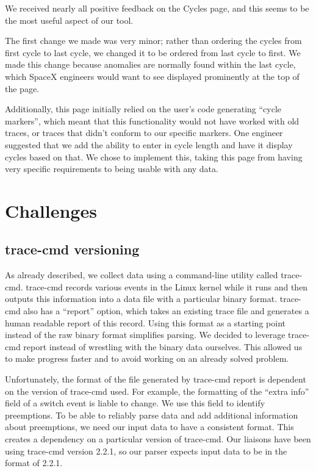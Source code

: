 \documentclass{hmcclinic}
\begin{document}
We received nearly all positive feedback on the Cycles page, and this seems to
be the most useful aspect of our tool.

The first change  we made was very minor; rather than ordering the cycles from first cycle to last cycle, we changed it to be ordered from last cycle to first. We made this change because anomalies are normally found within the last cycle, which SpaceX engineers would want to see displayed prominently at the top of the page.

Additionally, this page initially relied on the user's code generating ``cycle
markers'', which meant that this functionality would not have worked with old
traces, or traces that didn't conform to our specific markers. One engineer
suggested that we add the ability to enter in cycle length and have it display
cycles based on that. We chose to implement this, taking this page from having
very specific requirements to being usable with any data.

\chapter{Challenges}
\section{trace-cmd versioning} %
  As already described, we collect data using a command-line utility called
  trace-cmd. trace-cmd records various events in the Linux kernel while it runs
  and then outputs this information into a data file with a particular binary
  format. trace-cmd also has a ``report'' option, which takes an existing trace
  file and generates a human readable report of this record. Using this format
  as a starting point instead of the raw binary format simplifies parsing.
  We decided to leverage trace-cmd report instead of wrestling with the binary
  data ourselves. This allowed us to make progress faster and to avoid working
  on an already solved problem.

  Unfortunately, the format of the file generated by trace-cmd report is
  dependent on the version of trace-cmd used. For example, the formatting of the
  ``extra info'' field of a switch event is liable to change. We use this
  field to identify preemptions. To be able to reliably parse data and add
  additional information about preemptions, we need our input data to have
  a consistent format. This creates a dependency on a particular version
  of trace-cmd. Our liaisons have been using trace-cmd version 2.2.1, so
  our parser expects input data to be in the format of 2.2.1.
\end{document}
